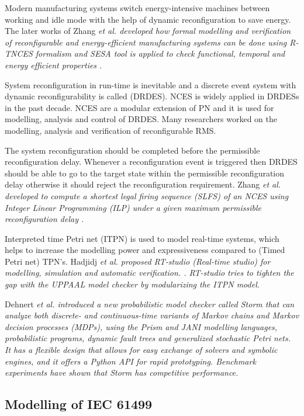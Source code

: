 \documentclass[runningheads]{llncs}
\newcommand{\etal}{\it et al. \normalfont}
\begin{document}
Modern manufacturing systems switch energy-intensive machines between working and idle mode with the help of dynamic reconfiguration to save energy. The later works of Zhang \etal developed how formal modelling and verification of reconfigurable and energy-efficient manufacturing systems can be done using R-TNCES formalism and SESA tool is applied to check functional, temporal and energy efficient properties \cite{zhang2015modeling,zhang2018simulation}.

System reconfiguration in run-time is inevitable and a discrete event system with dynamic reconfigurability is called (DRDES). NCES is widely applied in DRDESs in the past decade. NCES are a modular extension of PN and it is used for modelling, analysis and control of DRDES. Many researchers worked on the modelling, analysis and verification of reconfigurable RMS. 

The system reconfiguration should be completed before the permissible reconfiguration delay. Whenever a reconfiguration event is triggered then DRDES should be able to go to the target state within the permissible reconfiguration delay otherwise it should reject the reconfiguration requirement. Zhang \etal developed to compute a shortest legal firing sequence (SLFS) of an NCES using Integer Linear Programming (ILP) under a given maximum permissible reconfiguration delay \cite{zhang2018shortest}.

Interpreted time Petri net (ITPN) is used to model real-time systems, which helps to increase the modelling power and expressiveness compared to (Timed Petri net) TPN's. Hadjidj \etal proposed  RT-studio (Real-time studio) for  modelling, simulation and automatic verification. \cite{hadjidj2013rt}. RT-studio tries to tighten the gap with the UPPAAL model checker by modularizing the ITPN model.  

Dehnert \etal introduced a new probabilistic model checker \cite{dehnert2017storm, hensel2022probabilistic} called Storm that can analyze both discrete- and continuous-time variants of Markov chains and Markov decision processes  (MDPs), using the Prism and JANI modelling languages, probabilistic programs, dynamic fault trees and generalized stochastic Petri nets. It has a flexible design that allows for easy exchange of solvers and symbolic engines, and it offers a Python API for rapid prototyping. Benchmark experiments have shown that Storm has competitive performance.

\subsection{Modelling of IEC 61499}\label{sec:mod61499}
\end{document}
